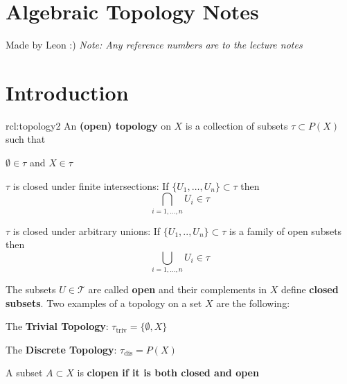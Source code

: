 \documentclass[landscape, 8pt]{extarticle}
\begin{document}
\setlength{\abovedisplayskip}{3.5pt}
\setlength{\belowdisplayskip}{3.5pt}
\setlength{\abovedisplayshortskip}{3.5pt}
\setlength{\belowdisplayshortskip}{3.5pt}
\setlength{\multicolsep}{0pt}%

\begin{multicols*}{3}
\raggedcolumns

\section*{\huge Algebraic Topology Notes}
Made by Leon :) \textit{Note: Any reference numbers are to the lecture notes}

\section{Introduction}
\setcounter{subsection}{1}

\begin{rcl}[Topology]{rcl:topology2}{}
	An \textbf{(open) topology} on $X$ is a collection of subsets $\tau \subset P(X)$ such that
	\begin{itemize-zero}
	    \item $\emptyset\in \tau$ and $X\in \tau$
	\end{itemize-zero}
	\begin{multicols}{2}
	\begin{itemize-zero}
		\item $\tau$ is closed under finite intersections: If $\{U_{1},\dots,U_{n}\} \subset \tau$ then
			\[\bigcap_{i=1,\dots,n} U_{i}\in \tau\]
		\item $\tau$ is closed under arbitrary unions: If $\{U_{1},. .,U_{n}\} \subset \tau$ is a family of open subsets then
			\[\bigcup_{i=1,\dots,n} U_{i}\in \tau\]
	\end{itemize-zero}
	\end{multicols}

	The subsets $U \in \mathcal{T}$ are called \textbf{open} and their complements in $X$ define \textbf{closed subsets}.
	\tcbline
	Two examples of a topology on a set $X$ are the following:
	\begin{itemize-tight}
	    \item The \textbf{Trivial Topology}: $\tau_{\mathrm{triv}} = \{\emptyset, X\}$
	    \item The \textbf{Discrete Topology}: $\tau_{\mathrm{dis}} = P(X)$
	\end{itemize-tight}
	\tcbline
	A subset $A \subset X$ is \textbf{clopen if it is both closed and open}
\end{rcl}


\end{multicols*}
\end{document}
